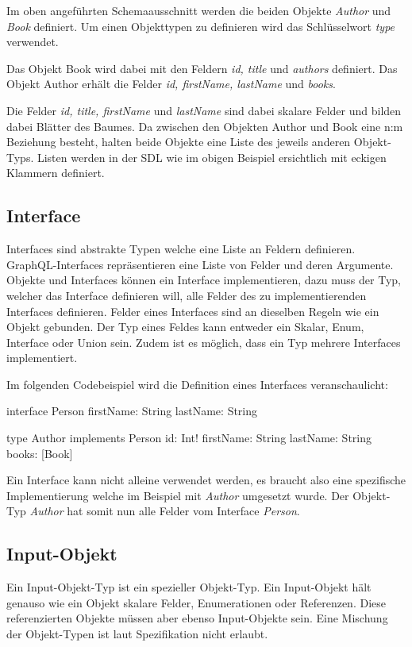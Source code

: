 Im oben angeführten Schemaausschnitt werden die beiden Objekte \textit{Author} und \textit{Book} definiert.
Um einen Objekttypen zu definieren wird das Schlüsselwort \textit{type} verwendet.

Das Objekt Book wird dabei mit den Feldern \textit{id, title} und \textit{authors} definiert.
Das Objekt Author erhält die Felder \textit{id, firstName, lastName} und \textit{books}.

Die Felder \textit{id, title, firstName} und \textit{lastName} sind dabei skalare Felder und bilden dabei Blätter des Baumes.
Da zwischen den Objekten Author und Book eine n:m Beziehung besteht, halten beide Objekte eine Liste des jeweils anderen Objekt-Typs.
Listen werden in der SDL wie im obigen Beispiel ersichtlich mit eckigen Klammern definiert.

\subsection{Interface}

Interfaces sind abstrakte Typen welche eine Liste an Feldern definieren.
GraphQL-Interfaces repräsentieren eine Liste von Felder und deren Argumente.
Objekte und Interfaces können ein Interface implementieren, dazu muss der Typ, welcher das Interface definieren will, alle Felder des zu implementierenden Interfaces definieren.
\newline
Felder eines Interfaces sind an dieselben Regeln wie ein Objekt gebunden.
Der Typ eines Feldes kann entweder ein Skalar, Enum, Interface oder Union sein.
Zudem ist es möglich, dass ein Typ mehrere Interfaces implementiert.
\newline


Im folgenden Codebeispiel wird die Definition eines Interfaces veranschaulicht:

\begin{JsCode}
interface Person {
    firstName: String
    lastName: String
}

type Author implements Person {
    id: Int!
    firstName: String
    lastName: String
    books: [Book]
}
\end{JsCode}

Ein Interface kann nicht alleine verwendet werden, es braucht also eine spezifische Implementierung welche im Beispiel mit \textit{Author} umgesetzt wurde.
Der Objekt-Typ \textit{Author} hat somit nun alle Felder vom Interface \textit{Person}.

\subsection{Input-Objekt}
Ein Input-Objekt-Typ ist ein spezieller Objekt-Typ. Ein Input-Objekt hält genauso wie ein Objekt skalare Felder, Enumerationen oder Referenzen.
Diese referenzierten Objekte müssen aber ebenso Input-Objekte sein. Eine Mischung der Objekt-Typen ist laut Spezifikation nicht erlaubt.
\newline


